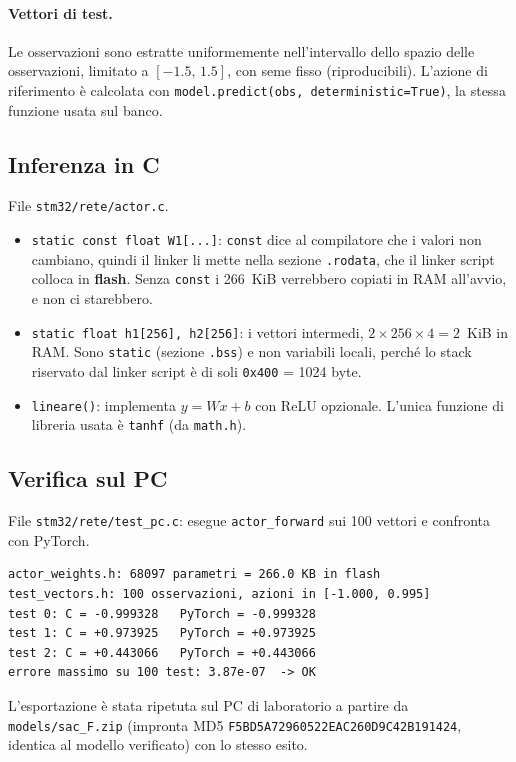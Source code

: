\documentclass[11pt,a4paper]{article}
\newcommand{\code}[1]{\texttt{\small #1}}
\begin{document}
\paragraph{Vettori di test.} Le osservazioni sono estratte uniformemente nell'intervallo dello spazio
delle osservazioni, limitato a $[-1.5,\,1.5]$, con seme fisso (riproducibili). L'azione di riferimento
è calcolata con \code{model.predict(obs, deterministic=True)}, la stessa funzione usata sul banco.

\subsection{Inferenza in C}
File \code{stm32/rete/actor.c}.


\begin{itemize}
\item \code{static const float W1[...]}: \code{const} dice al compilatore che i valori non cambiano,
  quindi il linker li mette nella sezione \code{.rodata}, che il linker script colloca in \textbf{flash}.
  Senza \code{const} i 266~KiB verrebbero copiati in RAM all'avvio, e non ci starebbero.
\item \code{static float h1[256], h2[256]}: i vettori intermedi, $2\times256\times4 = 2$~KiB in RAM.
  Sono \code{static} (sezione \code{.bss}) e non variabili locali, perché lo stack riservato dal
  linker script è di soli \code{0x400} = 1024 byte.
\item \code{lineare()}: implementa $y = Wx+b$ con ReLU opzionale. L'unica funzione di libreria usata è
  \code{tanhf} (da \code{math.h}).
\end{itemize}

\subsection{Verifica sul PC}
File \code{stm32/rete/test\_pc.c}: esegue \code{actor\_forward} sui 100 vettori e confronta con PyTorch.


\begin{risultato}
\begin{lstlisting}[style=sh]
actor_weights.h: 68097 parametri = 266.0 KB in flash
test_vectors.h: 100 osservazioni, azioni in [-1.000, 0.995]
test 0: C = -0.999328   PyTorch = -0.999328
test 1: C = +0.973925   PyTorch = +0.973925
test 2: C = +0.443066   PyTorch = +0.443066
errore massimo su 100 test: 3.87e-07  -> OK
\end{lstlisting}
L'esportazione è stata ripetuta sul PC di laboratorio a partire da \code{models/sac\_F.zip}
(impronta MD5 \code{F5BD5A72960522EAC260D9C42B191424}, identica al modello verificato) con lo stesso esito.
\end{risultato}
\end{document}
